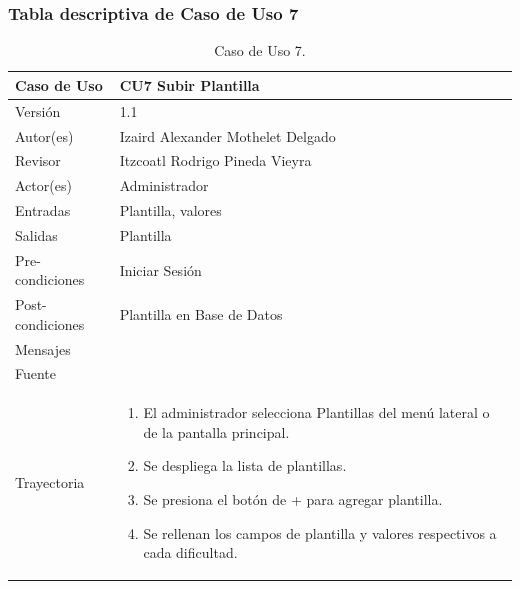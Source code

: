 \documentclass{article}
\begin{document}
\subsubsection{Tabla descriptiva de Caso de Uso 7}
\begin{table}[H]
\caption{Caso de Uso 7.}
\begin{tabular}{|M{4cm}|M{12cm}|}

\hline
Caso de Uso & CU7 Subir Plantilla\\ \hline
Versión & 1.1\\ \hline
Autor(es) & Izaird Alexander Mothelet Delgado\\ \hline
Revisor &  Itzcoatl Rodrigo Pineda Vieyra \\ \hline
Actor(es) & Administrador \\ \hline
Entradas &  Plantilla, valores \\ \hline
Salidas & Plantilla \\ \hline
Pre-condiciones & Iniciar Sesión \\ \hline
Post-condiciones & Plantilla en Base de Datos\\ \hline
Mensajes & \\ \hline
Fuente &  \\ \hline	
Trayectoria &

\begin{enumerate}
\item El administrador selecciona Plantillas del menú lateral o de la pantalla principal.
\item Se despliega la lista de plantillas.
\item Se presiona el botón de + para agregar plantilla.
\item Se rellenan los campos de plantilla y valores respectivos a  cada dificultad.
\end{enumerate}
\\ \hline
		
\end{tabular}
\end{table}
\end{document}
